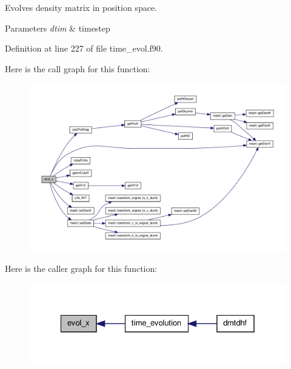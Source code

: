 Evolves density matrix in position space. 


\begin{DoxyParams}{Parameters}
{\em dtim} & timestep \\
\hline
\end{DoxyParams}


Definition at line 227 of file time\_\-evol.f90.



Here is the call graph for this function:\nopagebreak
\begin{figure}[H]
\begin{center}
\leavevmode
\includegraphics[width=400pt]{time__evol_8f90_a3b0f1dd129befe0c02108523072801e3_cgraph}
\end{center}
\end{figure}




Here is the caller graph for this function:
\nopagebreak
\begin{figure}[H]
\begin{center}
\leavevmode
\includegraphics[width=326pt]{time__evol_8f90_a3b0f1dd129befe0c02108523072801e3_icgraph}
\end{center}
\end{figure}


